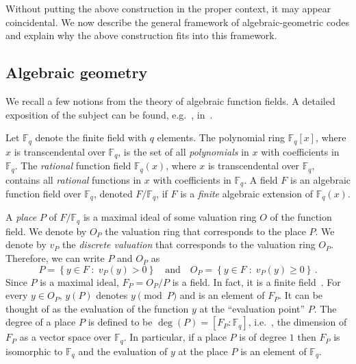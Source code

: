 \documentclass[10pt]{article}
\theoremstyle{definition}
\providecommand{\eg}{e.g.\ }
\providecommand{\ie}{i.e.\ }
\numberwithin{equation}{section}
\newcommand{\Fq}{{\mathbb{F}_q}}
\newcommand{\set}[1]{{\left\{#1\right\}}}
\begin{document}
Without putting the above construction in the proper context, it may
appear coincidental. We now describe the general framework of
algebraic-geometric codes and explain why the above construction
fits into this framework.

\subsection{Algebraic geometry}\label{subsec:AG-prel}
We recall a few notions from the theory of algebraic function
fields. A detailed exposition of the subject can be found, \eg,
in~\cite{S:93}.

Let $\Fq $ denote the finite field with $q$ elements. The polynomial
ring $\Fq [x]$, where $x$ is transcendental over $\Fq $, is the set
of all \emph{polynomials} in $x$ with coefficients in $\Fq $. The
\emph{rational} function field $\Fq (x)$, where $x$ is
transcendental over $\Fq $, contains all \emph{rational} functions
in $x$ with coefficients in $\Fq $. A field $F$ is an algebraic
function field over $\Fq$, denoted $F/\Fq $, if $F$ is a
\emph{finite} algebraic extension of $\Fq (x)$.

A \emph{place} $P$ of $F/\Fq $ is a maximal ideal of some valuation
ring $O$ of the function field. We denote by $O_P$ the valuation
ring that corresponds to the place $P$. We denote by $v_P$ the
\emph{discrete valuation} that corresponds to the valuation ring
$O_P$. Therefore, we can write $P$ and $O_P$ as $$P=\set{y \in F \;:\;
v_P(y)  >0}\quad\text{and}\quad O_P=\set{y \in F \;:\; v_P(y) \ge
0}\,.$$ Since $P$ is a maximal ideal, $F_P=O_P/P$ is a field. In fact,
it is a finite field~\cite[Proposition I.1.14]{S:93}. For every $y
\in O_P$, $y(P)$ denotes $y \pmod P$ and is an element of $F_P$. It
can be thought of as the evaluation of the function $y$ at the
``evaluation point'' $P$. The degree of a place $P$ is defined to be
$\deg(P)=[F_P:\Fq ]$, \ie, the dimension of $F_P$ as a vector space
over $\Fq$. In particular, if a place $P$ is of degree $1$ then
$F_P$ is isomorphic to $\Fq$ and the evaluation of $y$ at the place
$P$ is an element of $\Fq$.
\end{document}
